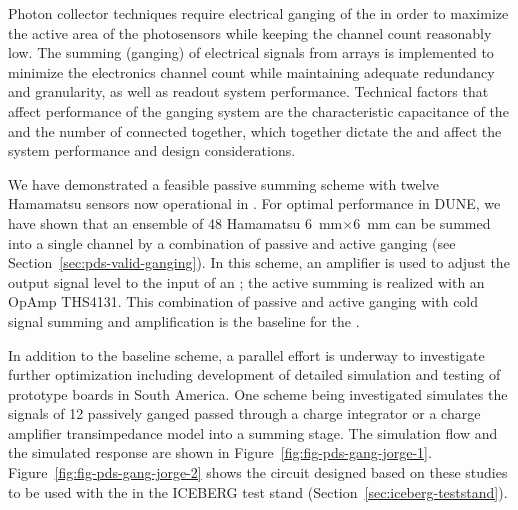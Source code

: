 Photon collector techniques require electrical ganging of the  in order to maximize the active area of the photosensors while keeping the channel count reasonably low. The summing (ganging) of electrical signals from  arrays is implemented to minimize the electronics channel count while maintaining adequate redundancy and granularity, as well as readout system performance.  Technical factors that affect performance of the ganging system are the characteristic capacitance of the  and the number of  connected together, which together dictate the  and affect the system performance and design considerations.

We have demonstrated a feasible passive summing scheme with twelve Hamamatsu  sensors now operational in . For optimal performance in DUNE, we have shown that an ensemble of 48 Hamamatsu \SI{6}{mm}$\times$\SI{6}{mm}  can be summed into a single channel by a combination of passive and active ganging (see Section~\ref{sec:pds-valid-ganging}).  In this scheme, an amplifier is used to adjust the  output signal level to the input of an ; the active summing is realized with an OpAmp THS4131. This combination of passive and active ganging with cold signal summing and amplification is the baseline for the .


In addition to the baseline scheme, a parallel effort is underway to investigate further optimization including development of detailed simulation and testing of prototype boards in South America. One scheme being investigated simulates the signals of 12 passively ganged  passed through a charge integrator or a charge amplifier transimpedance model into a summing stage. The simulation flow and the simulated response are shown in 
Figure~\ref{fig:fig-pds-gang-jorge-1}. Figure~\ref{fig:fig-pds-gang-jorge-2} shows the circuit designed based on these studies to be used with the  in the ICEBERG test stand (Section~\ref{sec:iceberg-teststand}).

